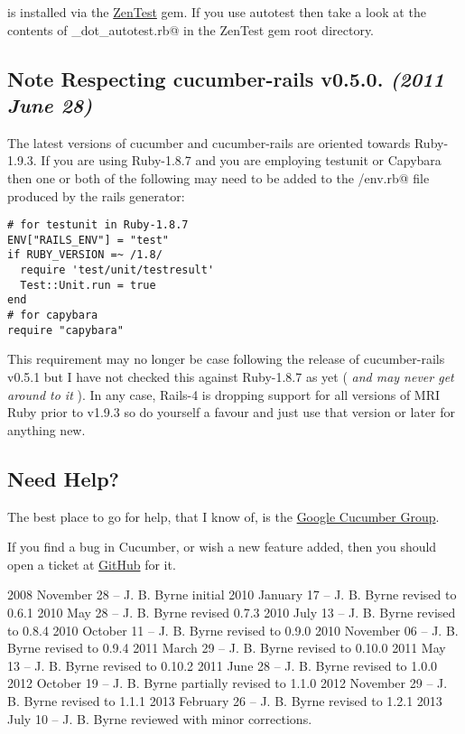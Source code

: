 \documentclass[10pt]{book}
\begin{document}
\verb@autotest@ is installed via the \href{http://www.zenspider.com/ZSS/Products/ZenTest/}{ZenTest} gem.  If you use autotest then take a look at the contents of \verb@example_dot_autotest.rb@ in the ZenTest gem root directory.

\subsection{Note Respecting cucumber-rails v0.5.0. \emph{(2011 June 28)}}

The latest versions of cucumber and cucumber-rails are oriented towards Ruby-1.9.3.  If you are using Ruby-1.8.7 and you are employing testunit or Capybara then one or both of the following may need to be added to the \verb@support/env.rb@ file produced by the rails generator:
\begin{verbatim}
# for testunit in Ruby-1.8.7
ENV["RAILS_ENV"] = "test"
if RUBY_VERSION =~ /1.8/
  require 'test/unit/testresult'
  Test::Unit.run = true
end
# for capybara
require "capybara"

\end{verbatim}

This requirement may no longer be case following the release of cucumber-rails v0.5.1 but I have not checked this against Ruby-1.8.7 as yet ( \emph{and may never get around to it} ).  In any case, Rails-4 is dropping support for all versions of MRI Ruby prior to v1.9.3 so do yourself a favour and just use that version or later for anything new.

\subsection{Need Help?}

The best place to go for help, that I know of, is the \href{http://groups.google.com/group/cukes}{Google Cucumber Group}.

If you find a bug in Cucumber, or wish a new feature added, then you should open a ticket at \href{https://github.com/cucumber/cucumber/issues}{GitHub} for it.

2008 November 28 -- J. B. Byrne initial
2010 January 17 -- J. B. Byrne revised to 0.6.1
2010 May 28 -- J. B. Byrne revised 0.7.3
2010 July 13 -- J. B. Byrne revised to 0.8.4
2010 October 11 -- J. B. Byrne revised to 0.9.0
2010 November 06 -- J. B. Byrne revised to 0.9.4
2011 March 29 -- J. B. Byrne revised to 0.10.0
2011 May 13 -- J. B. Byrne revised to 0.10.2
2011 June 28 -- J. B. Byrne revised to 1.0.0
2012 October 19 -- J. B. Byrne partially revised to 1.1.0
2012 November 29 -- J. B. Byrne revised to 1.1.1
2013 February 26 -- J. B. Byrne revised to 1.2.1
2013 July 10 -- J. B. Byrne reviewed with minor corrections.
\end{document}
